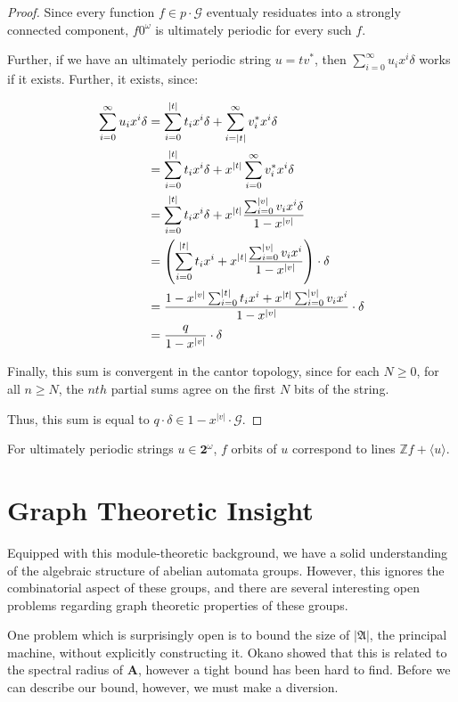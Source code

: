 \documentclass[12pt]{article}
\newcommand{\G}{\mathcal{G}}
\renewcommand{\P}{\mathfrak{A}}
\newcommand{\Z}{\mathbb{Z}}
\newcommand{\2}{\textbf{2}}
\newcommand{\Am}{\textbf{A}}
\begin{document}
\begin{proof}
  Since every function $f \in p \cdot \G$ eventualy residuates into a 
  strongly connected component, $f 0^\omega$ is ultimately periodic for
  every such $f$.

  Further, if we have an ultimately periodic string $u = tv^*$, then
  $\sum_{i=0}^{\infty} u_i x^i \delta$ works if it exists. Further,
  it exists, since:

  \begin{align*}
    \sum_{i=0}^{\infty} u_i x^i \delta 
    &= \sum_{i=0}^{|t|} t_i x^i \delta 
        + \sum_{i=|t|}^{\infty} v^*_i x^i \delta\\
    &= \sum_{i=0}^{|t|} t_i x^i \delta 
        + x^{|t|} \sum_{i=0}^{\infty} v^*_i x^i \delta\\
    &= \sum_{i=0}^{|t|} t_i x^i \delta 
         + x^{|t|} \frac{\sum_{i=0}^{|v|} v_i x^i \delta}{1 - x^{|v|}}\\
    &= \left ( 
        \sum_{i=0}^{|t|} t_i x^i
        + x^{|t|} \frac{\sum_{i=0}^{|v|} v_i x^i}{1 - x^{|v|}}
       \right ) \cdot \delta\\
    &= \frac%
        {%
          1 - x^{|v|} \sum_{i=0}^{|t|} t_i x^i + 
          x^{|t|} \sum_{i=0}^{|v|} v_i x^i
        }
        {1 - x^{|v|}}
       \cdot \delta\\
    &= \frac{q}{1 - x^{|v|}} \cdot \delta
  \end{align*}

  Finally, this sum is convergent in the cantor topology, since 
  for each $N \geq 0$, for all $n \geq N$, the $nth$ partial sums 
  agree on the first $N$ bits of the string.

  Thus, this sum is equal to $q \cdot \delta \in 1 - x^{|v|} \cdot \G$.
\end{proof}

For ultimately periodic strings $u \in \2^\omega$, $f$ orbits
of $u$ correspond to lines $\Z f + \langle u \rangle$.

\section{Graph Theoretic Insight}
Equipped with this module-theoretic background, 
we have a solid understanding of the algebraic structure of 
abelian automata groups. However, this ignores the combinatorial
aspect of these groups, and there are several interesting open 
problems regarding graph theoretic properties of these groups.

One problem which is surprisingly open is to bound the size of 
$|\P|$, the principal machine, without explicitly constructing it.
Okano showed that this is related to the spectral radius of $\Am$,
however a tight bound has been hard to find. Before we can describe
our bound, however, we must make a diversion.
\end{document}

